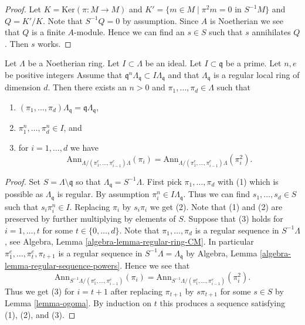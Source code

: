 \begin{proof}
Let $K = \text{Ker}(\pi : M \to M)$ and
$K' = \{m \in M \mid \pi^2 m = 0\text{ in }S^{-1}M\}$ and
$Q = K'/K$. Note that $S^{-1}Q = 0$ by assumption. Since $A$
is Noetherian we see that $Q$ is a finite $A$-module.
Hence we can find an $s \in S$ such that $s$ annihilates $Q$.
Then $s$ works.
\end{proof}

\begin{lemma}
\label{lemma-find-sequence}
Let $\Lambda$ be a Noetherian ring. Let $I \subset \Lambda$ be an ideal.
Let $I \subset \mathfrak q$ be a prime. Let $n, e$ be positive integers
Assume that $\mathfrak q^n\Lambda_\mathfrak q \subset I\Lambda_\mathfrak q$
and that $\Lambda_\mathfrak q$ is a regular local ring of dimension $d$.
Then there exists an $n > 0$ and
$\pi_1, \ldots, \pi_d \in \Lambda$ such that
\begin{enumerate}
\item $(\pi_1, \ldots, \pi_d)\Lambda_\mathfrak q =
\mathfrak q\Lambda_\mathfrak q$,
\item $\pi_1^n, \ldots, \pi_d^n \in I$, and
\item for $i = 1, \ldots, d$ we have
$$
\text{Ann}_{\Lambda/(\pi_1^e, \ldots, \pi_{i - 1}^e)\Lambda}(\pi_i) =
\text{Ann}_{\Lambda/(\pi_1^e, \ldots, \pi_{i - 1}^e)\Lambda}(\pi_i^2).
$$
\end{enumerate}
\end{lemma}

\begin{proof}
Set $S = \Lambda \setminus \mathfrak q$ so that
$\Lambda_\mathfrak q = S^{-1}\Lambda$.
First pick $\pi_1, \ldots, \pi_d$ with (1) which is possible
as $\Lambda_\mathfrak q$ is regular. By assumption
$\pi_i^n \in I\Lambda_\mathfrak q$. Thus we can find
$s_1, \ldots, s_d \in S$ such that $s_i\pi_i^n \in I$.
Replacing $\pi_i$ by $s_i\pi_i$ we get (2).
Note that (1) and (2) are preserved by further multiplying by elements of $S$.
Suppose that (3) holds for $i = 1, \ldots, t$ for some
$t \in \{0, \ldots, d\}$. Note that
$\pi_1, \ldots, \pi_d$ is a regular sequence in $S^{-1}\Lambda$, see
Algebra, Lemma \ref{algebra-lemma-regular-ring-CM}.
In particular $\pi_1^e, \ldots, \pi_t^e, \pi_{t + 1}$ is a
regular sequence in $S^{-1}\Lambda = \Lambda_\mathfrak q$ by
Algebra, Lemma \ref{algebra-lemma-regular-sequence-powers}.
Hence we see that
$$
\text{Ann}_{S^{-1}\Lambda/(\pi_1^e, \ldots, \pi_{i - 1}^e)}(\pi_i) =
\text{Ann}_{S^{-1}\Lambda/(\pi_1^e, \ldots, \pi_{i - 1}^e)}(\pi_i^2).
$$
Thus we get (3) for $i = t + 1$ after replacing $\pi_{t + 1}$ by $s\pi_{t + 1}$
for some $s \in S$ by Lemma \ref{lemma-ogoma}. By induction on $t$ this
produces a sequence satisfying (1), (2), and (3).
\end{proof}

